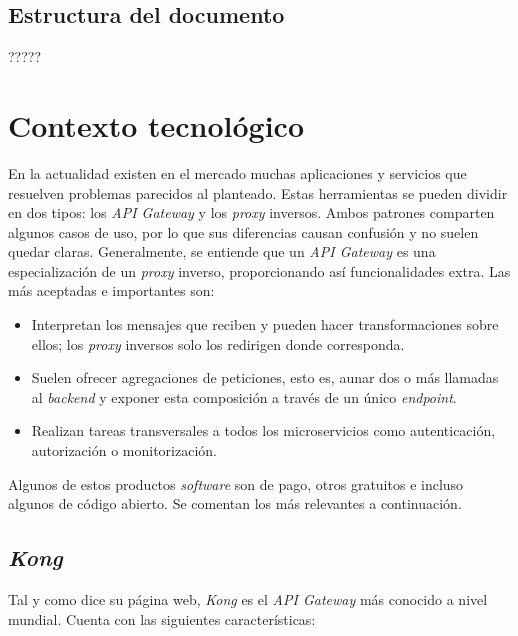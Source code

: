\documentclass[11pt,spanish,listoffigures]{tfgetsinf}
\begin{document}
\section{Estructura del documento}

?????


\chapter{Contexto tecnológico}

En la actualidad existen en el mercado muchas aplicaciones y servicios que resuelven problemas parecidos al planteado. Estas herramientas se pueden dividir en dos tipos: los \emph{API Gateway} y los \emph{proxy} inversos. Ambos patrones comparten algunos casos de uso, por lo que sus diferencias causan confusión y no suelen quedar claras. Generalmente, se entiende que un \emph{API Gateway} es una especialización de un \emph{proxy} inverso, proporcionando así funcionalidades extra. Las más aceptadas e importantes son:

\begin{itemize}

	\item Interpretan los mensajes que reciben y pueden hacer transformaciones sobre ellos; los \emph{proxy} inversos solo los redirigen donde corresponda.
	\item Suelen ofrecer agregaciones de peticiones, esto es, aunar dos o más llamadas al \emph{backend} y exponer esta composición a través de un único \emph{endpoint}.
	\item Realizan tareas transversales a todos los microservicios como autenticación, autorización o monitorización.

\end{itemize}

Algunos de estos productos \emph{software} son de pago, otros gratuitos e incluso algunos de código abierto. Se comentan los más relevantes a continuación.

\section{\emph{Kong}}
Tal y como dice su página web, \emph{Kong} \cite{Kong} es el \emph{API Gateway} más conocido a nivel mundial. Cuenta con las siguientes características:
\end{document}
